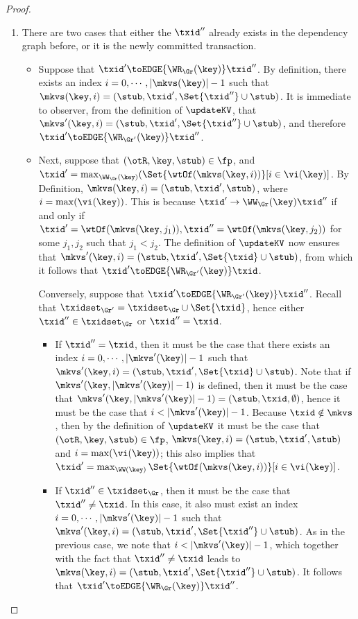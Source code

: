 \begin{proof}
\begin{enumerate}
\item There are two cases that either the \( \txid'' \) already exists in the dependency graph before,
or it is the newly committed transaction.
\begin{itemize}
\item Suppose that $\txid' \toEDGE{\WR_{\Gr}(\key)} \txid''$. 
By definition, there exists an index $i = 0,\cdots, \lvert \mkvs(\key) \rvert - 1$ 
such that $\mkvs(\key, i) = (\stub, \txid', \Set{\txid''} \cup \stub)$. It is immediate 
to observer, from the definition of $\updateKV$, that $\mkvs'(\key, i) = (\stub, \txid', \Set{\txid''} \cup \stub)$, 
and therefore $\txid' \toEDGE{\WR_{\Gr'}(\key)} \txid''$. 

\item Next, suppose that $(\otR, \key, \stub) \in \fp$, and $\txid' = \max_{\WW_{\Gr}(\key)}(\Set{\wtOf(\mkvs(\key, i))}[i \in \vi(\key)]$. 
By Definition, $\mkvs(\key, i) = (\stub, \txid', \stub)$, where $i = \max(\vi(\key))$. This is because 
$\txid' \rightarrow{\WW_{\Gr}(\key)} \txid''$ if and only if $\txid' = \wtOf(\mkvs(\key, j_1)), \txid'' = 
\wtOf(\mkvs(\key, j_2))$ for some $j_1, j_2$ such that $j_1 < j_2$. 
The definition of $\updateKV$ now ensures that $\mkvs'(\key, i) = (\stub, \txid', \Set{\txid } \cup \stub)$, 
from which it follows that $\txid' \toEDGE{\WR_{\Gr'}(\key)} \txid$.

Conversely, suppose that $\txid' \toEDGE{\WR_{\Gr'}(\key)} \txid''$. 
Recall that $\txidset_{\Gr'} = \txidset_{\Gr} \cup \Set{ \txid }$, hence either 
$\txid'' \in \txidset_{\Gr}$ or $\txid'' = \txid$. 

\begin{itemize}
\item If $\txid'' = \txid$, then it must be the case that there exists an index $i = 0,\cdots, \lvert \mkvs'(\key) \rvert - 1$ 
such that $\mkvs'(\key, i) = (\stub, \txid', \Set{\txid } \cup \stub)$. Note that if $\mkvs'(\key, \lvert \mkvs'(\key) \rvert -1)$ is 
defined, then it must be the case that $\mkvs'(\key, \lvert \mkvs'(\key) \rvert -1) = (\stub, \txid, \emptyset)$, 
hence it must be the case that $i < \lvert \mkvs'(\key) \rvert - 1$. Because $\txid \notin \mkvs$, 
then by the definition of $\updateKV$ it must be the case that $(\otR, \key, \stub) \in \fp$, 
$\mkvs(\key, i) = (\stub, \txid', \stub)$ and $i = \max(\vi(\key))$; this also implies that $\txid' = 
\max_{\WW(\key)}\Set{\wtOf(\mkvs(\key, i))}[i \in \vi(\key)]$. 

\item If $\txid'' \in \txidset_{\Gr}$, then  it must be the case that $\txid'' \neq \txid$. 
In this case, it also must exist an index $i = 0,\cdots, \lvert \mkvs'(\key) \rvert - 1$ 
such that $\mkvs'(\key, i) = (\stub, \txid', \Set{\txid''} \cup \stub)$. As in the previous 
case, we note that $i < \lvert \mkvs'(\key) \rvert - 1$, which together 
with the fact that $\txid'' \neq \txid$ leads to $\mkvs(\key, i) = (\stub, \txid', \Set{\txid''} \cup \stub)$. 
It follows that $\txid' \toEDGE{\WR_{\Gr}(\key)} \txid''$.
\end{itemize}
\end{itemize}


\end{enumerate}
\end{proof}
